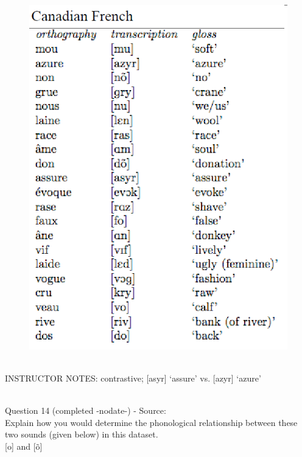 \documentclass[12pt]{article}
\begin{document}
\begin{figure}[H]
\includegraphics{../images/canadianfrench.png}
\end{figure}

~\\
INSTRUCTOR NOTES: contrastive; [asyr] ‘assure’ vs. [azyr] ‘azure’


~\\

{\large Question 14} (completed -nodate-) - Source: \\

Explain how you would determine the phonological relationship between these two sounds (given below) in this dataset.\\

{[o]} and {[õ]}
\end{document}
